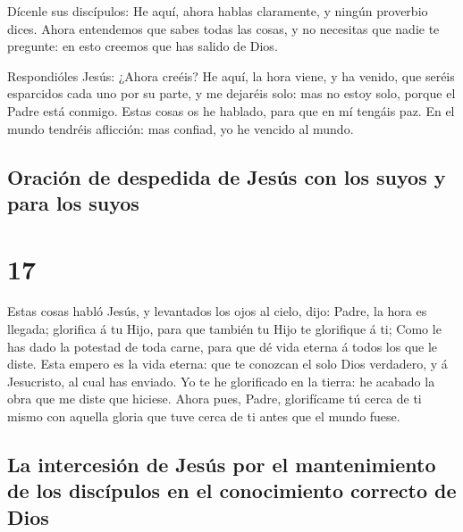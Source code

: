  Dícenle sus discípulos: He aquí, ahora hablas
claramente, y ningún proverbio dices.  Ahora entendemos
que sabes todas las cosas, y no necesitas que nadie te pregunte: en esto
creemos que has salido de Dios.

 Respondióles Jesús: ¿Ahora creéis?  He
aquí, la hora viene, y ha venido, que seréis esparcidos cada uno por su
parte, y me dejaréis solo: mas no estoy solo, porque el Padre está
conmigo.  Estas cosas os he hablado, para que en mí
tengáis paz. En el mundo tendréis aflicción: mas confiad, yo he vencido
al mundo.

\hypertarget{oraciuxf3n-de-despedida-de-jesuxfas-con-los-suyos-y-para-los-suyos}{%
\subsection{Oración de despedida de Jesús con los suyos y para los
suyos}\label{oraciuxf3n-de-despedida-de-jesuxfas-con-los-suyos-y-para-los-suyos}}

\hypertarget{section-43-17}{%
\section{17}\label{section-43-17}}

 Estas cosas habló Jesús, y levantados los ojos al cielo,
dijo: Padre, la hora es llegada; glorifica á tu Hijo, para que también
tu Hijo te glorifique á ti;  Como le has dado la potestad
de toda carne, para que dé vida eterna á todos los que le diste.
 Esta empero es la vida eterna: que te conozcan el solo
Dios verdadero, y á Jesucristo, al cual has enviado.  Yo
te he glorificado en la tierra: he acabado la obra que me diste que
hiciese.  Ahora pues, Padre, glorifícame tú cerca de ti
mismo con aquella gloria que tuve cerca de ti antes que el mundo fuese.

\hypertarget{la-intercesiuxf3n-de-jesuxfas-por-el-mantenimiento-de-los-discuxedpulos-en-el-conocimiento-correcto-de-dios}{%
\subsection{La intercesión de Jesús por el mantenimiento de los
discípulos en el conocimiento correcto de
Dios}\label{la-intercesiuxf3n-de-jesuxfas-por-el-mantenimiento-de-los-discuxedpulos-en-el-conocimiento-correcto-de-dios}}

